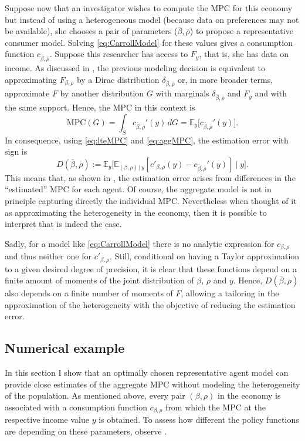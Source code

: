 \documentclass[english, a4paper, 12pt]{article}
\begin{document}
Suppose now that an investigator wishes to compute the MPC for this economy but instead of using a heterogeneous model (because data on preferences may not be available), she chooses a pair of parameters ($\overline{\beta}, \overline{\rho}$) to propose a representative consumer model. Solving \eqref{eq:CarrollModel} for these values gives a consumption function $c_{\overline{\beta}, \overline{\rho}}$. Suppose this researcher has access to $F_{y}$, that is, she has data on income. As discussed in , the previous modeling decision is equivalent to approximating $F_{\beta,\rho}$ by a Dirac distribution $\delta_{\overline{\beta},\overline{\rho}}$ or, in more broader terms, approximate $F$ by another distribution $G$ with marginals $\delta_{\overline{\beta},\overline{\rho}}$ and $F_{y}$ and with the same support. Hence, the MPC in this context is
	\begin{equation} \label{eq:aggMPC}
		\mathrm{MPC}(G) 
			= \int_{S} c_{\overline{\beta},\overline{\rho}}'(y) \, dG 
			= \mathbb{E}_{y}\Big[ c_{\overline{\beta},\overline{\rho}}'(y) \Big].
	\end{equation}	
In consequence, using \eqref{eq:lteMPC} and \eqref{eq:aggMPC}, the estimation error with sign is
	$$D(\overline{\beta}, \overline{\rho})
		:=	\mathbb{E}_{y}\Big[ \mathbb{E}_{(\beta,\rho) \, | \, y}[c'_{\beta,\rho}(y) -  c_{\overline{\beta},\overline{\rho}}'(y) ] \; \Big| \; y \Big].$$
This means that, as shown in , the estimation error arises from differences in the ``estimated'' MPC for each agent. Of course, the aggregate model is not in principle capturing directly the individual MPC. Nevertheless when thought of it as approximating the heterogeneity in the economy, then it is possible to interpret that is indeed the case.

Sadly, for a model like \eqref{eq:CarrollModel} there is no analytic expression for $c_{\beta,\rho}$ and thus neither one for $c'_{\beta,\rho}$. Still, conditional on having a Taylor approximation to a given desired degree of precision, it is clear that these functions depend on a finite amount of moments of the joint distribution of $\beta$, $\rho$ and $y$. Hence, $D(\overline{\beta}, \overline{\rho})$ also depends on a finite number of moments of $F$, allowing a tailoring in the approximation of the heterogeneity with the objective of reducing the estimation error.

\subsection{Numerical example}
In this section I show that an optimally chosen representative agent model can provide close estimates of the aggregate MPC without modeling the heterogeneity of the population. As mentioned above, every pair $(\beta,\rho)$ in the economy is associated with a consumption function $c_{\beta,\rho}$ from which the MPC at the respective income value $y$ is obtained. To assess how different the policy functions are depending on these parameters, observe . 
\end{document}
